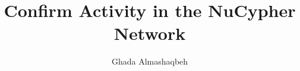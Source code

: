 \documentclass{llncs}
\begin{document}
\title{\Large \bf Confirm Activity in the NuCypher Network}
\author{Ghada Almashaqbeh}

\date{} %



\maketitle



\clearpage



\clearpage







\end{document}
